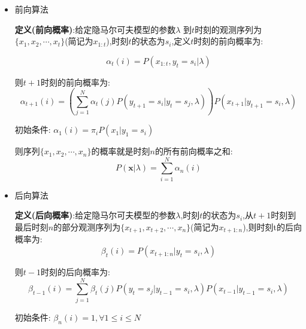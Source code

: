 \documentclass[UTF8,a4paper]{ctexart}%
\begin{document}
            \begin{itemize}
              \item 前向算法

                  \textbf{定义(前向概率)}:给定隐马尔可夫模型的参数$\lambda$
                  到$t$时刻的观测序列为$\{x_1,x_2 , \cdots , x_t\}$(简记为$x_{1:t}$),时刻$t$的状态为$s_i$,定义$t$时刻的前向概率为:

                  \begin{equation}
                    \alpha_t(i) = P(x_{1:t},y_t = s_i|\lambda)
                  \end{equation}

                  则$t+1$时刻的前向概率为:
                  \begin{equation}
                    \alpha_{t+1}(i) = \left ( \sum_{j =1}^N \alpha_t(j)P(y_{t+1} = s_i|y_t = s_j,\lambda) \right ) P(x_{t+1}|y_{t+1} = s_i,\lambda)
                  \end{equation}

                  初始条件:
                  $\alpha_1(i) = \pi_iP(x_1 |y_1 = s_i)$

                  则序列$\{x_1,x_2 , \cdots , x_n\}$的概率就是时刻$n$的所有前向概率之和:
                  \begin{equation}
                    P(\bm{x}|\lambda) = \sum_{i = 1}^N \alpha_n(i)
                  \end{equation}

              \item 后向算法

                  \textbf{定义(后向概率)}:给定隐马尔可夫模型的参数$\lambda$,时刻$t$的状态为$s_i$,从$t+1$时刻到最后时刻$n$的部分观测序列为$\{x_{t+1},x_{t+2} , \cdots , x_n\}$(简记为$x_{t+1:n}$),则时刻t的后向概率为:
                  \begin{equation}
                    \beta_t(i) = P(x_{t+1:n}|y_t = s_i , \lambda)
                  \end{equation}

                  则$t-1$时刻的后向概率为:
                  \begin{equation}
                    \beta_{t-1}(i) = \sum_{j = 1}^N \beta_{t}(j)P(y_{t} = s_j|y_{t-1} = s_i,\lambda)P(x_{t-1}|y_{t-1} = s_i,\lambda)
                  \end{equation}

                  初始条件:
                  $\beta_n(i) = 1,\forall 1 \leqslant i \leqslant N$


\end{itemize}
\end{document}
